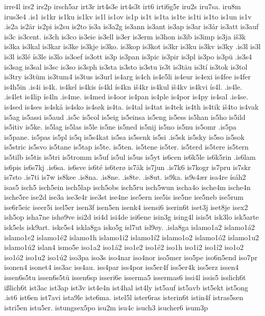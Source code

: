 {{irre4l
irs2
irs2p
irsch5ar
irt3r
irt4s3e
irt4s3t
irt6
irti6g5r
iru2s
iru7sa.
iru8m
irus3e4
.is1
is1kr
is1ku
is1kv
is1l
is1ov
is1p
is1t
is1ta
is1te
is1ti
is1to
is1un
is1v
.is2a
is2är
is2pi
is2su
is2to
ïs3a
is3a2g
is3ann
is3ant
is3ap
is3ar
is3år
is3att
is3auf
is3c
is3cent.
is3ch
is3co
is3eie
is3ell
is3er
is3erm
is3hon
is3ib
is3imp
is3ja
iš3k
is3ka
is3kal
is3kar
is3ke
is3kje
is3ko.
is3kop
is3kot
is3kr
is3ku
is3kv
is3ky
.is3l
is3l
ïs3l
is3lé
ís3le
is3lo
is3oef
is3ott
is3p
is3pan
is3pic
is3pir
is3pl
is3po
is3pü
.is3s4
is3sag
is3sal
is3sc
is3so
is3sph
is3sta
is3sto
is3stu
ïs3t
is3täu
is3tí
is3tok
is3tol
is3try
is3tüm
is3tum4
is3tus
is3url
is4arg
is4ch
is4e5li
is4eur
is4exi
is4fee
is4fer
is4h5in
.is4i
is4k.
is4kel
is4kis
ís4kl
ís4kn
iš4kr
is4kul
iš4kv
is4kvi
ís4l.
.is4le.
.is4let
is4lip
ís4ln
.is4me.
is4med
is4oor
is4pan
is4ple
is4por
is4py
is4sal
.is4se.
is4sed
is4ses
is4skå
is4sko
is4søk
is4ta.
is4tal
is4tat
is4tek
is4th
is4tik
iš4to
is4vak
is5ag
is5assi
is5aud
.is5c
is5col
is5eig
is5einsa
is5eng
is5ess
is5han
is5ho
is5ild
is5itiv
is5ke.
is5lag
is5las
is5le
is5ne
is5ned
is5nij
is5no
is5nu
is5omr
.is5pa
is5pane.
is5pas
is5pl
is5q
is5s4kat
is5sa
is5senk
is5si
.is5sk
is5sky
is5so
is5sok
is5stric
is5svo
is5tane
is5tap
is5te.
is5ten.
is5tene
is5ter.
is5terd
is5tere
is5tern
is5tilb
is5tis
is5tri
is5tromm
is5uf
is5ul
is5us
is5yt
is6cen
is6k5le
is6k5rin
.is6lam
is6pis
is6s7kj
.is6sa.
is6sve
is6té
is6terø
is7åk
is7jun
.is7k6
is7kogr
is7pru
is7skr
is7sto
.is7ti
is7w
is8kee
.is8na.
.is8ne.
.is8te.
.is8ut.
is9ka.
is9s4ær
isa4re
ísáh2
isas5
isch5
isch5ein
isch5lap
isch5obs
isch5ru
isch5wun
ischa4o
ische4m
ische4n
ische5re
ise2d
ise3a
ise3e4r
ise3st
ise4ne
ise5ern
ise5is
ise5ne
ise5neb
ise5rum
ise6r5eic
iseer5i
isel5er
isen3f
isen5en
isenk4
isensi6
iserin6t
iset3j
iset8je
isex2
ish5op
isha7ne
ishø9ve
isi2d
isi4d
isi4de
isi6ene
isin3g
ising4l
isis5t
isk3lo
isk5arte
isk5els
isk9art.
iske5s4
iskla8ga
isko5g
isl7ut
isl9øy.
.isla8ga
islamo1a2
islamo1á2
islamo1e2
islamo1é2
islamo1h
islamo1i2
islamo1í2
islamo1o2
islamo1ó2
islamo1u2
islamo1ú2
islan4
ismo5e
iso1a2
iso1á2
iso1e2
iso1é2
iso1h
iso1i2
iso1í2
iso1o2
iso1ó2
iso1u2
iso1ú2
iso3pa
iso3s
iso4nar
iso4nor
iso5mer
iso5pe
iso6n5end
iso7pr
isonen4
isonet4
iss3ac
iss4au.
iss4par
iss4por
iss5er4f
iss5er4k
iss5erz
issen4
issen6s5tu
issen6s5tü
issen6sp
isseri6e
isserma5
issermas6
issi4l
issis5
isslich6t
ißlich6t
ist3ac
ist3ap
ist3v
ist4e4n
ist4hal
ist4ly
ist5auf
ist5avb
ist5ekt
ist5ong
.ist6
ist6en
ist7avi
ista9le
iste6ma.
istel5l
ister6ras
isterin6t
istin4f
istras5sen
istri5en
istu5er.
istungsex5po
isu2m
isu4c
isuch3
isucher6
isum3p
}}

